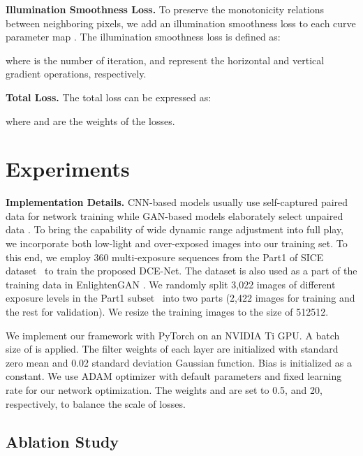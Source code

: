\documentclass[10pt,twocolumn,letterpaper]{article}
\begin{document}
\noindent
\textbf{Illumination Smoothness Loss.} To preserve the monotonicity relations between neighboring pixels, we add an illumination smoothness loss to each curve parameter map . The illumination smoothness loss  is defined as:

where  is the number of iteration,  and  represent the horizontal and vertical gradient operations, respectively.



\noindent
\textbf{Total Loss.}
The total loss can be expressed as:

where  and  are the weights of the losses.




\section{Experiments}

\noindent
\textbf{Implementation Details.}
CNN-based models usually use self-captured paired data for network training \cite{Chen2018,Chenchen2018,Wang2019,LightenNet,wang2019salient,xu2020deep} while GAN-based models elaborately select unpaired data \cite{Jiang2019,lcy2018spl,Yu2018,Chencvpr2018,Ignatov2018}. To bring the capability of wide dynamic range adjustment into full play, we incorporate both low-light and over-exposed images into our training set. To this end, we employ 360 multi-exposure sequences from the Part1 of SICE dataset~\cite{Cai2018} to train the proposed DCE-Net. The dataset is also used as a part of the training data in EnlightenGAN \cite{Jiang2019}.
We randomly split 3,022 images of different exposure levels in the Part1 subset~\cite{Cai2018} into two parts (2,422 images for training and the rest for validation).
We resize the training images to the size of 512512.


We implement our framework with PyTorch on an NVIDIA Ti GPU.
A batch size of  is applied.
The filter weights of each layer are initialized with standard zero mean and 0.02 standard deviation Gaussian function.
Bias is initialized as a constant.
We use ADAM optimizer with default parameters and fixed learning rate  for our network optimization.
The weights  and  are set to 0.5, and 20, respectively, to balance the scale of losses.




\vspace{-5pt}
\subsection{Ablation Study}
\end{document}
